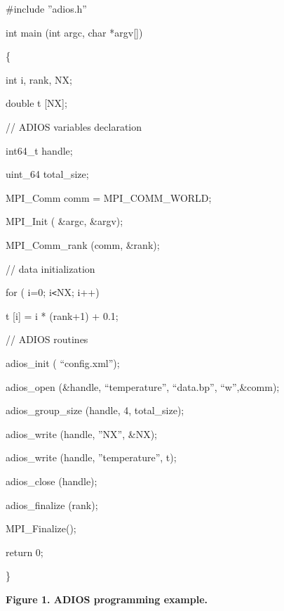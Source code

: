 \#include ''adios.h''

int main (int argc, char *argv[])

\{

\parindent=14pt
int i, rank, NX;

double t [NX];

\parindent=28pt
// ADIOS variables declaration

\parindent=14pt
int64\_t handle;

uint\_64 total\_size;

\parindent=28pt
MPI\_Comm comm = MPI\_COMM\_WORLD;

\parindent=14pt
MPI\_Init ( \&argc, \&argv);

MPI\_Comm\_rank (comm, \&rank); 

\parindent=28pt
// data initialization

\parindent=14pt
for ( i=0; i\texttt{<}NX; i++)

\parindent=28pt
t [i] = i * (rank+1) + 0.1;

\parindent=14pt
// ADIOS routines

adios\_init ( ``config.xml'');

\parindent=28pt
adios\_open (\&handle, ``temperature'', ``data.bp'', ``w'',\&comm);

\parindent=14pt
adios\_group\_size (handle, 4, total\_size);

adios\_write (handle, ''NX'', \&NX);

\parindent=28pt
adios\_write (handle, ''temperature'', t);

\parindent=14pt
adios\_close (handle);

adios\_finalize (rank);

\parindent=28pt
MPI\_Finalize();

\parindent=14pt
return 0;

\parindent=0pt
\}

\label{HRef119578178}\label{HToc144350161}

\leftskip=18pt
{\color{color20} \textbf{Figure 1. ADIOS programming example.\label{HToc84890240}\label{HToc212016616}\label{HToc212016858}\label{HToc182553354}}}
